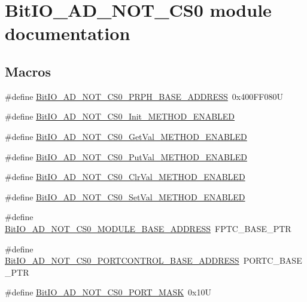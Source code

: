 \hypertarget{group___bit_i_o___a_d___n_o_t___c_s0__module}{\section{Bit\-I\-O\-\_\-\-A\-D\-\_\-\-N\-O\-T\-\_\-\-C\-S0 module documentation}
\label{group___bit_i_o___a_d___n_o_t___c_s0__module}
}
\subsection*{Macros}
\begin{DoxyCompactItemize}
\item 
\#define \hyperlink{group___bit_i_o___a_d___n_o_t___c_s0__module_ga9c1cc64708821c4e4d397c7a8345f269}{Bit\-I\-O\-\_\-\-A\-D\-\_\-\-N\-O\-T\-\_\-\-C\-S0\-\_\-\-P\-R\-P\-H\-\_\-\-B\-A\-S\-E\-\_\-\-A\-D\-D\-R\-E\-S\-S}~0x400\-F\-F080\-U
\item 
\#define \hyperlink{group___bit_i_o___a_d___n_o_t___c_s0__module_ga3a810cb4f734387ff85dc3dbdadc0922}{Bit\-I\-O\-\_\-\-A\-D\-\_\-\-N\-O\-T\-\_\-\-C\-S0\-\_\-\-Init\-\_\-\-M\-E\-T\-H\-O\-D\-\_\-\-E\-N\-A\-B\-L\-E\-D}
\item 
\#define \hyperlink{group___bit_i_o___a_d___n_o_t___c_s0__module_gaddc72642a6f8cce8a35a67d3f37efb14}{Bit\-I\-O\-\_\-\-A\-D\-\_\-\-N\-O\-T\-\_\-\-C\-S0\-\_\-\-Get\-Val\-\_\-\-M\-E\-T\-H\-O\-D\-\_\-\-E\-N\-A\-B\-L\-E\-D}
\item 
\#define \hyperlink{group___bit_i_o___a_d___n_o_t___c_s0__module_ga738cab7fa2aab0829a3c25fc313638ec}{Bit\-I\-O\-\_\-\-A\-D\-\_\-\-N\-O\-T\-\_\-\-C\-S0\-\_\-\-Put\-Val\-\_\-\-M\-E\-T\-H\-O\-D\-\_\-\-E\-N\-A\-B\-L\-E\-D}
\item 
\#define \hyperlink{group___bit_i_o___a_d___n_o_t___c_s0__module_gafb93cf05e806f579406552d635e656be}{Bit\-I\-O\-\_\-\-A\-D\-\_\-\-N\-O\-T\-\_\-\-C\-S0\-\_\-\-Clr\-Val\-\_\-\-M\-E\-T\-H\-O\-D\-\_\-\-E\-N\-A\-B\-L\-E\-D}
\item 
\#define \hyperlink{group___bit_i_o___a_d___n_o_t___c_s0__module_ga399b34c934ec46309d4e62cb359571e6}{Bit\-I\-O\-\_\-\-A\-D\-\_\-\-N\-O\-T\-\_\-\-C\-S0\-\_\-\-Set\-Val\-\_\-\-M\-E\-T\-H\-O\-D\-\_\-\-E\-N\-A\-B\-L\-E\-D}
\item 
\#define \hyperlink{group___bit_i_o___a_d___n_o_t___c_s0__module_gab25ecbae95d5301513df81f7b488265c}{Bit\-I\-O\-\_\-\-A\-D\-\_\-\-N\-O\-T\-\_\-\-C\-S0\-\_\-\-M\-O\-D\-U\-L\-E\-\_\-\-B\-A\-S\-E\-\_\-\-A\-D\-D\-R\-E\-S\-S}~F\-P\-T\-C\-\_\-\-B\-A\-S\-E\-\_\-\-P\-T\-R
\item 
\#define \hyperlink{group___bit_i_o___a_d___n_o_t___c_s0__module_ga25c5c1ff59964e94ca77fd8b5329b5cb}{Bit\-I\-O\-\_\-\-A\-D\-\_\-\-N\-O\-T\-\_\-\-C\-S0\-\_\-\-P\-O\-R\-T\-C\-O\-N\-T\-R\-O\-L\-\_\-\-B\-A\-S\-E\-\_\-\-A\-D\-D\-R\-E\-S\-S}~P\-O\-R\-T\-C\-\_\-\-B\-A\-S\-E\-\_\-\-P\-T\-R
\item 
\#define \hyperlink{group___bit_i_o___a_d___n_o_t___c_s0__module_ga7c14908f19ba0b2fd369c0f0662608c2}{Bit\-I\-O\-\_\-\-A\-D\-\_\-\-N\-O\-T\-\_\-\-C\-S0\-\_\-\-P\-O\-R\-T\-\_\-\-M\-A\-S\-K}~0x10\-U
\end{DoxyCompactItemize}
